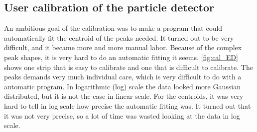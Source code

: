 \documentclass[twoside,english]{uiofysmaster/uiofysmaster}
\let\orgautoref\autoref
\renewcommand{\autoref}
        {%
		 \def\subsectionautorefname{Section}%
		 \def\subsubsectionautorefname{Section}%
          \orgautoref}
\begin{document}
\subsection{User calibration of the particle detector}\label{ssec:user_cal}
An ambitious goal of the calibration was to make a program that could automatically fit the centroid of the peaks needed. 
It turned out to be very difficult, and it became more and more manual labor. 
Because of the complex peak shapes, it is very hard to do an automatic fitting it seems. 
\autoref{fig:cal_ED} shows one strip that is easy to calibrate and one that is difficult to calibrate.
The peaks demands very much individual care, which is very difficult to do with a automatic program. 
In logarithmic (log) scale the data looked more Gaussian distributed, but it is not the case in linear scale. 
For the centroids, it was very hard to tell in log scale how precise the automatic fitting was. 
It turned out that it was not very precise, so a lot of time was wasted looking at the data in log scale. 
\end{document}
